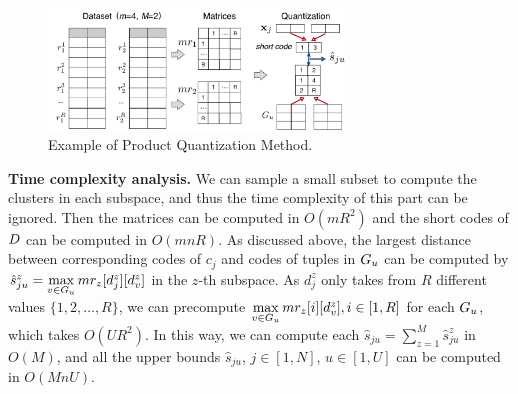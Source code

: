 \begin{figure}[t]
    \centering
    \includegraphics[width=0.7\textwidth]{figs/pq}
    \caption{Example of Product Quantization Method.}
    \label{fig:codebook}
\end{figure}

\noindent \textbf{Time complexity analysis.}
We can sample a small subset to compute the clusters in each subspace, and thus the time complexity of this part can be ignored. 
%
Then the matrices can be computed in $O(mR^2)$ and the short codes of $D$ can be computed in $O(mnR)$. 
%
%
As discussed above,  the largest distance between corresponding codes of  $c_j$ and codes of tuples in $G_u$ can be computed by $\hat{s}_{ju}^z = \max\limits_{v\in G_u}mr_z[d_{j}^z][d_v^z]$ in the $z$-th subspace. 
%
%
As $d_j^z$ only takes from $R$ different values $\{1, 2, \dots, R\}$, we can precompute $\max\limits_{v\in G_u}mr_z[i][d_v^z], i\in[1, R]$ for each $G_u$, which takes $O(UR^2)$. In this way, we can compute each $\hat{s}_{ju}=\sum_{z=1}^{M}\hat{s}^z_{ju}$ in $O(M)$, and all the upper bounds $\hat{s}_{ju}$, $j\in [1,N]$, $u\in [1,U]$ can be computed in  $O(MnU)$.%

